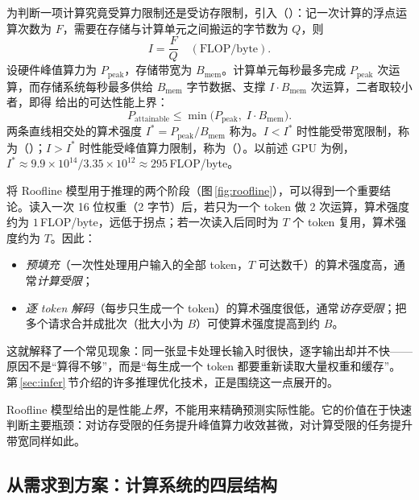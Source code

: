 为判断一项计算究竟受算力限制还是受访存限制，引入（）：记一次计算的浮点运算次数为 $F$，需要在存储与计算单元之间搬运的字节数为 $Q$，则
\begin{equation}
  I = \frac{F}{Q}\quad(\text{FLOP/byte}).
\end{equation}
设硬件峰值算力为 $P_{\mathrm{peak}}$，存储带宽为 $B_{\mathrm{mem}}$。计算单元每秒最多完成 $P_{\mathrm{peak}}$ 次运算，而存储系统每秒最多供给 $B_{\mathrm{mem}}$ 字节数据、支撑 $I\cdot B_{\mathrm{mem}}$ 次运算，二者取较小者，即得 \cite{williams2009roofline}给出的可达性能上界：
\begin{equation}
  P_{\mathrm{attainable}} \le \min\bigl(P_{\mathrm{peak}},\; I\cdot B_{\mathrm{mem}}\bigr).
  \label{eq:roofline}
\end{equation}
两条直线相交处的算术强度 $I^{*}=P_{\mathrm{peak}}/B_{\mathrm{mem}}$ 称为。$I<I^{*}$ 时性能受带宽限制，称为（）；$I>I^{*}$ 时性能受峰值算力限制，称为（）。以前述 GPU 为例，$I^{*}\approx 9.9\times10^{14}/3.35\times10^{12}\approx 295$\,FLOP/byte。



将 Roofline 模型用于推理的两个阶段（图\,\ref{fig:roofline}），可以得到一个重要结论。读入一次 16 位权重（2 字节）后，若只为一个 token 做 2 次运算，算术强度约为 $1$\,FLOP/byte，远低于拐点；若一次读入后同时为 $T$ 个 token 复用，算术强度约为 $T$。因此：
\begin{itemize}
  \item \emph{预填充}（一次性处理用户输入的全部 token，$T$ 可达数千）的算术强度高，通常\emph{计算受限}；
  \item \emph{逐 token 解码}（每步只生成一个 token）的算术强度很低，通常\emph{访存受限}；把多个请求合并成批次（批大小为 $B$）可使算术强度提高到约 $B$。
\end{itemize}
这就解释了一个常见现象：同一张显卡处理长输入时很快，逐字输出却并不快——原因不是“算得不够”，而是“每生成一个 token 都要重新读取大量权重和缓存”。第\,\ref{sec:infer}\,节介绍的许多推理优化技术，正是围绕这一点展开的。

\begin{pitfall}
Roofline 模型给出的是性能\emph{上界}，不能用来精确预测实际性能。它的价值在于快速判断主要瓶颈：对访存受限的任务提升峰值算力收效甚微，对计算受限的任务提升带宽同样如此。
\end{pitfall}

\subsection{从需求到方案：计算系统的四层结构}
\label{subsec:four-layers}

